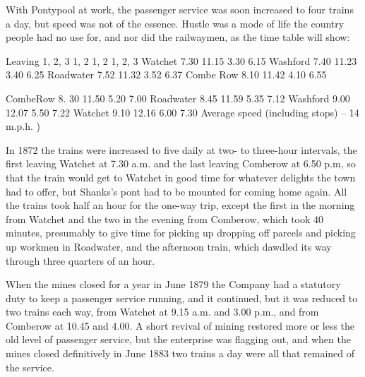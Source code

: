 \documentclass[10pt,a4paper]{article}
\begin{document}
With Pontypool at work, the passenger service was soon increased to four trains a day, but speed was not of the essence. Hustle was a mode of life the country people had no use for, and nor did the railwaymen, as the time table will show:

Leaving	1, 2, 3	                1, 2	 1, 2	1, 2, 3
Watchet	  7.30		  11.15	  3.30	  6.15
Washford	  7.40		  11.23	  3.40	  6.25
Roadwater	  7.52		  11.32	   3.52	  6.37
Combe Row	  8.10                   11.42	   4.10	  6.55

CombeRow	  8. 30		  11.50	   5.20	  7.00
Roadwater	  8.45		  11.59	   5.35	  7.12
Washford	  9.00		  12.07	   5.50	   7.22
Watchet	  9.10		  12.16	   6.00	   7.30
 Average speed (including stops) – 14 m.p.h.                  )
 
In 1872 the trains were increased to five daily at two- to three-hour intervals, the first leaving Watchet at 7.30 a.m. and the last leaving Comberow at 6.50 p.m, so that the train would  get to Watchet in good time for whatever delights the town had to offer, but Shanks’s pont had to be mounted for coming home again. All the trains took half an hour for the one-way trip, except the first in the morning from Watchet and the two in the evening from Comberow, which took 40 minutes, presumably to give time for picking up dropping off parcels and picking up workmen in Roadwater, and the afternoon train, which dawdled its way through three quarters of an hour. 

When the mines closed for a year in June 1879 the Company had a statutory duty to keep a passenger service running, and it continued, but it was reduced to two trains each way, from Watchet at 9.15 a.m. and 3.00 p.m., and from Comberow at 10.45 and 4.00. A short revival of mining restored more or less the old level of passenger service, but the enterprise was flagging out, and when the mines closed definitively in June 1883 two trains a day were all that remained of the service.
\end{document}
